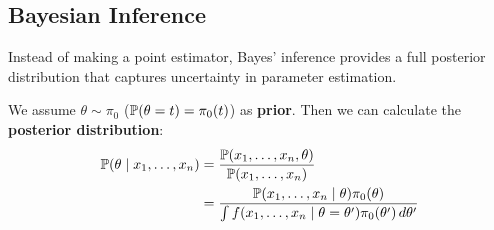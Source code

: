 \subsection{Bayesian Inference}
Instead of making a point estimator, Bayes' inference provides a full posterior distribution that captures uncertainty in parameter estimation.

We assume \(\theta \sim \pi_0\) (\(\P(\theta = t) = \pi_0(t)\)) as \textbf{prior}. Then we can calculate the \textbf{posterior distribution}:
\begin{align*}
  \P(\theta \mid x_1, \ldots, x_n) &= \frac{\P(x_1, \ldots, x_n, \theta)}{\P(x_1, \ldots, x_n)}\\
  &= \frac{\P(x_1, \ldots, x_n \mid \theta) \pi_0(\theta)}{\int f(x_1, \ldots, x_n \mid \theta = \theta')\pi_0(\theta') \, d\theta'}
\end{align*}

